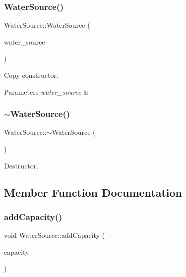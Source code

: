 \subsubsection{\texorpdfstring{Water\+Source()}{WaterSource()}\hspace{0.1cm}{\footnotesize\ttfamily [6/6]}}
{\footnotesize\ttfamily Water\+Source\+::\+Water\+Source (\begin{DoxyParamCaption}\item[{const \mbox{\hyperlink{classWaterSource}{Water\+Source}} \&}]{water\+\_\+source }\end{DoxyParamCaption})}

Copy constructor. 
\begin{DoxyParams}{Parameters}
{\em water\+\_\+source} & \\
\hline
\end{DoxyParams}
\mbox{\label{classWaterSource_a48d9be2deccd87e1d1cdcbb4b2df83cf}} 
\subsubsection{\texorpdfstring{$\sim$\+Water\+Source()}{~WaterSource()}}
{\footnotesize\ttfamily Water\+Source\+::$\sim$\+Water\+Source (\begin{DoxyParamCaption}{ }\end{DoxyParamCaption})\hspace{0.3cm}{\ttfamily [virtual]}}

Destructor. 

\subsection{Member Function Documentation}
\mbox{\label{classWaterSource_abffedb6e58620b1b1d6f3c4b4480d3a0}} 
\subsubsection{\texorpdfstring{add\+Capacity()}{addCapacity()}}
{\footnotesize\ttfamily void Water\+Source\+::add\+Capacity (\begin{DoxyParamCaption}\item[{double}]{capacity }\end{DoxyParamCaption})\hspace{0.3cm}{\ttfamily [virtual]}}



